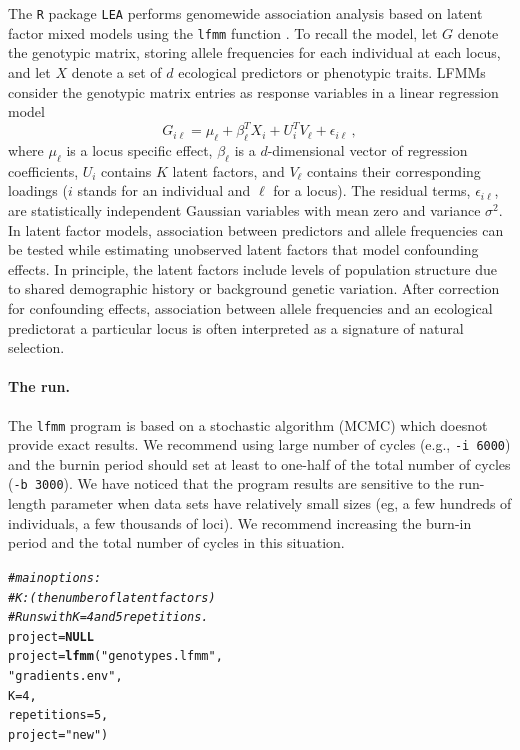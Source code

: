 \documentclass[12pt,a4paper,oneside]{article}\usepackage[]{graphicx}\usepackage[]{color}
\makeatletter
\newcommand{\hlnum}[1]{\textcolor[rgb]{0.686,0.059,0.569}{#1}}%
\newcommand{\hlstr}[1]{\textcolor[rgb]{0.192,0.494,0.8}{#1}}%
\newcommand{\hlcom}[1]{\textcolor[rgb]{0.678,0.584,0.686}{\textit{#1}}}%
\newcommand{\hlstd}[1]{\textcolor[rgb]{0.345,0.345,0.345}{#1}}%
\newcommand{\hlkwa}[1]{\textcolor[rgb]{0.161,0.373,0.58}{\textbf{#1}}}%
\newcommand{\hlkwb}[1]{\textcolor[rgb]{0.69,0.353,0.396}{#1}}%
\newcommand{\hlkwc}[1]{\textcolor[rgb]{0.333,0.667,0.333}{#1}}%
\newcommand{\hlkwd}[1]{\textcolor[rgb]{0.737,0.353,0.396}{\textbf{#1}}}%
\newenvironment{kframe}{%
 \def\at@end@of@kframe{}%
 \ifinner\ifhmode%
  \def\at@end@of@kframe{\end{minipage}}%
  \begin{minipage}{\columnwidth}%
 \fi\fi%
 \def\FrameCommand##1{\hskip\@totalleftmargin \hskip-\fboxsep
 \colorbox{shadecolor}{##1}\hskip-\fboxsep
     \hskip-\linewidth \hskip-\@totalleftmargin \hskip\columnwidth}%
 \MakeFramed {\advance\hsize-\width
   \@totalleftmargin\z@ \linewidth\hsize
   \@setminipage}}%
 {\par\unskip\endMakeFramed%
 \at@end@of@kframe}
\newenvironment{knitrout}{}{} %
\makeatother
\begin{document}
The {\tt R} package {\tt LEA} performs genomewide association analysis based on latent factor mixed models using the {\tt lfmm} function \citep{Frichot_2013}. To recall the model, let $G$ denote the genotypic matrix, storing allele frequencies for each individual at each locus, and let $X$ denote a set of $d$ ecological predictors or phenotypic traits. LFMMs consider the genotypic matrix entries as response variables in a linear regression model
\begin{equation}
 G_{i\ell} = \mu_\ell + \beta_{\ell}^TX_{i} + U_i^TV_\ell + \epsilon_{i\ell} \, ,
 \end{equation}
where $\mu_\ell$ is a locus specific effect, $\beta_\ell$ is a $d$-dimensional vector of regression coefficients, $U_i$ contains $K$ latent factors, and $V_\ell$ contains their corresponding loadings ($i$ stands for an individual and $\ell$ for a locus). The residual terms, $\epsilon_{i\ell}$, are statistically independent Gaussian variables with mean zero and variance $\sigma^2$.
\newline
\newline
 In latent factor models, association between predictors and allele frequencies can be tested while estimating unobserved latent factors that model confounding effects. In principle, the latent factors include levels of population structure due to shared demographic history or background genetic variation. After correction for confounding effects, association between allele frequencies and an ecological predictorat a particular locus is often interpreted as a signature of natural selection.


\paragraph{The run.}  The {\tt lfmm} program is based on a stochastic algorithm (MCMC) which doesnot provide exact results. We recommend using large number of cycles (e.g., {\tt -i 6000}) and the burnin period should set at least to one-half of the total number of cycles ({\tt -b 3000}). We have noticed that the program results are sensitive to the run-length parameter when data sets have relatively small sizes (eg, a few hundreds of individuals, a few thousands of loci). We recommend increasing  the burn-in period and the total number of cycles in this situation.


\begin{knitrout}
\color{fgcolor}\begin{kframe}
\begin{alltt}
\hlcom{# main options: }
\hlcom{# K: (the number of latent factors)}
\hlcom{# Runs with K = 4 and 5 repetitions.}
\hlstd{project} \hlkwb{=} \hlkwa{NULL}
\hlstd{project} \hlkwb{=} \hlkwd{lfmm}\hlstd{(}\hlstr{"genotypes.lfmm"}\hlstd{,}
               \hlstr{"gradients.env"}\hlstd{,}
                \hlkwc{K} \hlstd{=} \hlnum{4}\hlstd{,}
                \hlkwc{repetitions} \hlstd{=} \hlnum{5}\hlstd{,}
                \hlkwc{project} \hlstd{=} \hlstr{"new"}\hlstd{)}
\end{alltt}
\end{kframe}
\end{knitrout}
\end{document}
